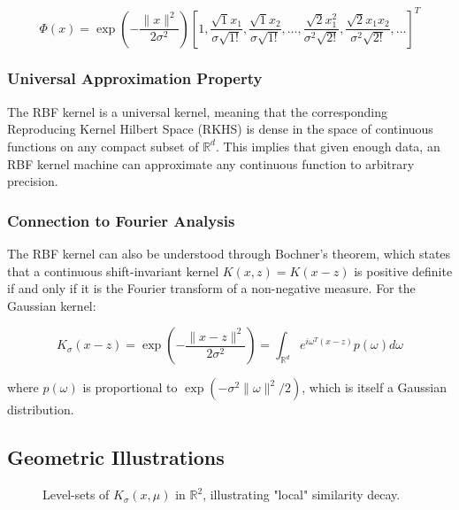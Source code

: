 \documentclass[11pt]{article}
\begin{document}
\[
\Phi(x) = \exp\left(-\frac{\|x\|^2}{2\sigma^2}\right) \left[1, \frac{\sqrt{1}x_1}{\sigma\sqrt{1!}}, \frac{\sqrt{1}x_2}{\sigma\sqrt{1!}}, \ldots, \frac{\sqrt{2}x_1^2}{\sigma^2\sqrt{2!}}, \frac{\sqrt{2}x_1x_2}{\sigma^2\sqrt{2!}}, \ldots\right]^T
\]

\subsubsection{Universal Approximation Property}
The RBF kernel is a universal kernel, meaning that the corresponding Reproducing Kernel Hilbert Space (RKHS) is dense in the space of continuous functions on any compact subset of $\mathbb{R}^d$. This implies that given enough data, an RBF kernel machine can approximate any continuous function to arbitrary precision.

\subsubsection{Connection to Fourier Analysis}
The RBF kernel can also be understood through Bochner's theorem, which states that a continuous shift-invariant kernel $K(x,z) = K(x-z)$ is positive definite if and only if it is the Fourier transform of a non-negative measure. For the Gaussian kernel:

\[
K_\sigma(x-z) = \exp\left(-\frac{\|x-z\|^2}{2\sigma^2}\right) = \int_{\mathbb{R}^d} e^{i\omega^T(x-z)} p(\omega) d\omega
\]

where $p(\omega)$ is proportional to $\exp(-\sigma^2\|\omega\|^2/2)$, which is itself a Gaussian distribution.

\subsection{Geometric Illustrations}
\begin{figure}[h]
  \centering
  \caption{Level-sets of $K_\sigma(x,\mu)$ in $\mathbb{R}^2$, illustrating "local" similarity decay.}
\end{figure}
\end{document}
